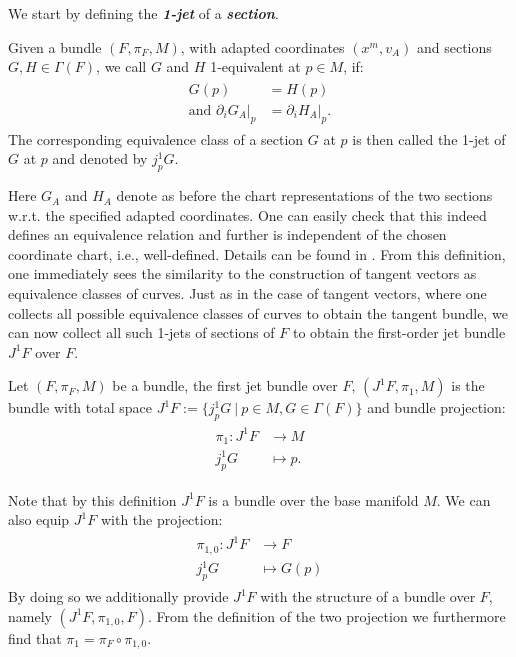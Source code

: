 We start by defining the \textbf{\textit{1-jet}} of a \textbf{\textit{section}}.
\begin{definition}[1-jet] 
Given a bundle $(F, \pi_F, M)$, with adapted coordinates $(x^m, v_A)$ and sections $G,H \in \Gamma(F)$, we call $G$ and $H$ 1-equivalent at $p 
\in M$, if:
\begin{align}
    \begin{aligned}
    G(p) &= H(p) \\
    \text{and \ \ }
    \partial_i G_A \big \vert_p &= \partial_i H_A \big \vert_p.
    \end{aligned}
\end{align}
The corresponding equivalence class of a section $G$ at $p$ is then called the 1-jet of $G$ at $p$ and denoted by $j^1_pG$.
\end{definition}
Here $G_A$ and $H_A$ denote as before the chart representations of the two sections w.r.t. the specified adapted coordinates. One can easily check that this indeed defines an equivalence relation and further is independent of the chosen coordinate chart, i.e., well-defined. Details can be found in \cite{saunders_1989}. From this definition, one immediately sees the similarity to the construction of tangent vectors as equivalence classes of curves. Just as in the case of tangent vectors, where one collects all possible equivalence classes of curves to obtain the tangent bundle, we can now collect all such 1-jets of sections of $F$ to obtain the first-order jet bundle $J^1F$ over $F$. 
\begin{definition}
Let $(F, \pi_F, M)$ be a bundle, the first jet bundle over $F$, $(J^1F,\pi_1,M)$ is the bundle with total space $J^1F := \{j^1_pG \ \vert \  p \in M, G \in \Gamma(F)\}$ and bundle projection: 
\begin{align}
    \begin{aligned}
\pi_1 : J^1F &\longrightarrow M \\
j^1_pG &\longmapsto p.
    \end{aligned}
\end{align}
\end{definition}
\begin{remark}
Note that by this definition $J^1F$ is a bundle over the base manifold $M$. We can also equip $J^1F$ with the projection: 
\begin{align}
    \begin{aligned}
    \pi_{1,0} : J^1F &\longrightarrow F \\
    j^1_pG &\longmapsto G(p)
    \end{aligned}
\end{align}
By doing so we additionally provide $J^1F$ with the structure of a bundle over $F$, namely $(J^1F,\pi_{1,0},F)$. From the definition of the two projection we furthermore find that $\pi_1 = \pi_F \circ \pi_{1,0}$. 
\end{remark}
